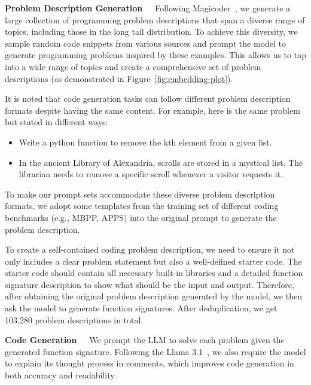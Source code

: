 \textbf{Problem Description Generation}\ \ \ Following Magicoder~\cite{wei2024magicoder}, we generate a large collection of programming problem descriptions that span a diverse range of topics, including those in the long tail distribution. To achieve this diversity, we sample random code snippets from various sources and prompt the model to generate programming problems inspired by these examples. This allows us to tap into a wide range of topics and create a comprehensive set of problem descriptions (as demonstrated in Figure~\ref{fig:embedding-plot}).


It is noted that code generation tasks can follow different problem description formats despite having the same content. For example, here is the same problem but stated in different ways:
\begin{itemize}[nosep,leftmargin=*]
    \item Write a python function to remove the kth element from a given list.
    \item In the ancient Library of Alexandria, scrolls are stored in a mystical list. The librarian needs to remove a specific scroll whenever a visitor requests it.
\end{itemize}

To make our prompt sets accommodate these diverse problem description formats, we adopt some templates from the training set of different coding benchmarks (e.g., MBPP, APPS) into the original prompt to generate the problem description.

To create a self-contained coding problem description, we need to ensure it not only includes a clear problem statement but also a well-defined starter code. The starter code should contain all necessary built-in libraries and a detailed function signature description to show what should be the input and output. Therefore, after obtaining the original problem description generated by the model, we then ask the model to generate function signatures. After deduplication, we get 103,280 problem descriptions in total.

\textbf{Code Generation}\ \ \ We prompt the LLM to solve each problem given the generated function signature. Following the Llama 3.1~\cite{dubey2024llama}, we also require the model to explain its thought process in comments, which improves code generation in both accuracy and readability.

